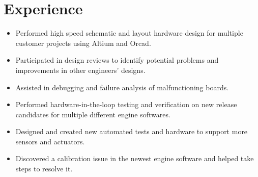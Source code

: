 \documentclass[]{deedy-resume-openfont}
\begin{document}
\begin{minipage}[t]{0.66\textwidth} 


\section{Experience}


\begin{itemize}
    \setlength\itemsep{0pt}
    \item Performed high speed schematic and layout hardware design for multiple customer projects using Altium and Orcad.    
    \item Participated in design reviews to identify potential problems and improvements in other engineers' designs.
    \item Assisted in debugging and failure analysis of malfunctioning boards. 
\end{itemize}


\begin{itemize}
    \setlength\itemsep{0pt}
    \item Performed hardware-in-the-loop testing and verification on new release candidates for multiple different engine softwares.
    \item Designed and created new automated tests and hardware to support more sensors and actuators.
    \item Discovered a calibration issue in the newest engine software and helped take steps to resolve it. 
\end{itemize}




\end{minipage}
\end{document}
